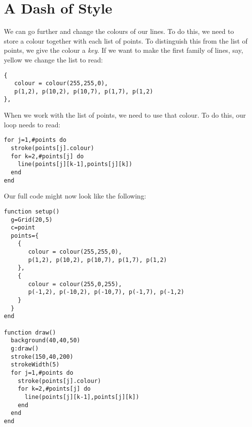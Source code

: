 \documentclass[
  xhtml,%
  use filename%
]{internet}
\begin{document}
\section{A Dash of Style}

We can go further and change the colours of our lines.
To do this, we need to store a colour together with each list of points.
To distinguish this from the list of points, we give the colour a \emph{key}.
If we want to make the first family of lines, say, yellow we change the list to read:

\begin{verbatim}
{
   colour = colour(255,255,0),
   p(1,2), p(10,2), p(10,7), p(1,7), p(1,2)
},
\end{verbatim}

When we work with the list of points, we need to use that colour.
To do this, our loop needs to read:

\begin{verbatim}
for j=1,#points do
  stroke(points[j].colour)
  for k=2,#points[j] do
    line(points[j][k-1],points[j][k])
  end
end
\end{verbatim}

Our full code might now look like the following:

\begin{verbatim}
function setup()
  g=Grid(20,5)
  c=point
  points={
    {
       colour = colour(255,255,0),
       p(1,2), p(10,2), p(10,7), p(1,7), p(1,2)
    },
    {
       colour = colour(255,0,255),
       p(-1,2), p(-10,2), p(-10,7), p(-1,7), p(-1,2)
    }
  }
end

function draw()
  background(40,40,50)
  g:draw()
  stroke(150,40,200)
  strokeWidth(5)
  for j=1,#points do
    stroke(points[j].colour)
    for k=2,#points[j] do
      line(points[j][k-1],points[j][k])
    end
  end
end
\end{verbatim}
\end{document}
